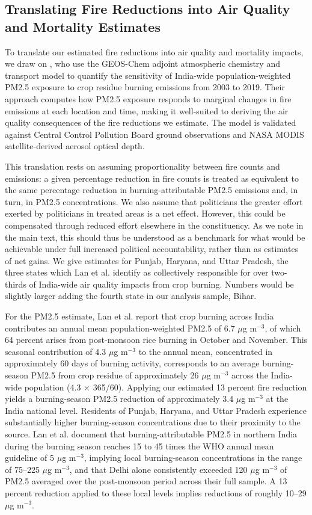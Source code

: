 \documentclass[12pt]{article}
\begin{document}
\FloatBarrier
\subsection{Translating Fire Reductions into Air Quality and Mortality Estimates}\label{sec:mortality_estimates}

To translate our estimated fire reductions into air quality and mortality impacts, we draw on \citet{lan2022air}, who use the GEOS-Chem adjoint atmospheric chemistry and transport model to quantify the sensitivity of India-wide population-weighted PM2.5 exposure to crop residue burning emissions from 2003 to 2019. Their approach computes how PM2.5 exposure responds to marginal changes in fire emissions at each location and time, making it well-suited to deriving the air quality consequences of the fire reductions we estimate. The model is validated against Central Control Pollution Board ground observations and NASA MODIS satellite-derived aerosol optical depth. 

This translation rests on assuming proportionality between fire counts and emissions: a given percentage reduction in fire counts is treated as equivalent to the same percentage reduction in burning-attributable PM2.5 emissions and, in turn, in PM2.5 concentrations. We also assume that politicians the greater effort exerted by politicians in treated areas is a net effect. However, this could be compensated through reduced effort elsewhere in the constituency. As we note in the main text, this should thus be understood as a benchmark for what would be achievable under full increased political accountability, rather than as estimates of  net gains. We give estimates for Punjab, Haryana, and Uttar Pradesh, the three states which Lan et al. identify as collectively responsible for over two-thirds of India-wide air quality impacts from crop burning. Numbers would be slightly larger adding the fourth state in our analysis sample, Bihar.

For the PM2.5 estimate, Lan et al. report that crop burning across India contributes an annual mean population-weighted PM2.5 of 6.7 $\mu$g m$^{-3}$, of which 64 percent arises from post-monsoon rice burning in October and November. This seasonal contribution of 4.3 $\mu$g m$^{-3}$ to the annual mean, concentrated in approximately 60 days of burning activity, corresponds to an average burning-season PM2.5 from crop residue of approximately 26 $\mu$g m$^{-3}$ across the India-wide population (4.3 × 365/60). Applying our estimated 13 percent fire reduction yields a burning-season PM2.5 reduction of approximately 3.4 $\mu$g m$^{-3}$ at the India national level. Residents of Punjab, Haryana, and Uttar Pradesh experience substantially higher burning-season concentrations due to their proximity to the source. Lan et al. document that burning-attributable PM2.5 in northern India during the burning season reaches 15 to 45 times the WHO annual mean guideline of 5 $\mu$g m$^{-3}$, implying local burning-season concentrations in the range of 75–225 $\mu$g m$^{-3}$, and that Delhi alone consistently exceeded 120 $\mu$g m$^{-3}$ of PM2.5 averaged over the post-monsoon period across their full sample. A 13 percent reduction applied to these local levels implies reductions of roughly 10–29 $\mu$g m$^{-3}$. 
\end{document}
